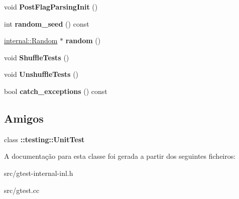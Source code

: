 \begin{DoxyCompactItemize}
\item 
\hypertarget{classtesting_1_1internal_1_1UnitTestImpl_a772894193104b1b2516f16e6ff813168}{void {\bfseries Post\-Flag\-Parsing\-Init} ()}\label{classtesting_1_1internal_1_1UnitTestImpl_a772894193104b1b2516f16e6ff813168}

\item 
\hypertarget{classtesting_1_1internal_1_1UnitTestImpl_a8ec59a7ab3bad96bccde98ce85ffc864}{int {\bfseries random\-\_\-seed} () const }\label{classtesting_1_1internal_1_1UnitTestImpl_a8ec59a7ab3bad96bccde98ce85ffc864}

\item 
\hypertarget{classtesting_1_1internal_1_1UnitTestImpl_ab3b45b5eb4d583219a3602011ea44347}{\hyperlink{classtesting_1_1internal_1_1Random}{internal\-::\-Random} $\ast$ {\bfseries random} ()}\label{classtesting_1_1internal_1_1UnitTestImpl_ab3b45b5eb4d583219a3602011ea44347}

\item 
\hypertarget{classtesting_1_1internal_1_1UnitTestImpl_aaaa38e6a4372e6bb9bbe3143a3a32b65}{void {\bfseries Shuffle\-Tests} ()}\label{classtesting_1_1internal_1_1UnitTestImpl_aaaa38e6a4372e6bb9bbe3143a3a32b65}

\item 
\hypertarget{classtesting_1_1internal_1_1UnitTestImpl_a1ee7db3bf8284dd9dce4dc857564bce3}{void {\bfseries Unshuffle\-Tests} ()}\label{classtesting_1_1internal_1_1UnitTestImpl_a1ee7db3bf8284dd9dce4dc857564bce3}

\item 
\hypertarget{classtesting_1_1internal_1_1UnitTestImpl_a0bbc6e237776ee6afaee106fe83e0406}{bool {\bfseries catch\-\_\-exceptions} () const }\label{classtesting_1_1internal_1_1UnitTestImpl_a0bbc6e237776ee6afaee106fe83e0406}

\end{DoxyCompactItemize}
\subsection*{Amigos}
\begin{DoxyCompactItemize}
\item 
\hypertarget{classtesting_1_1internal_1_1UnitTestImpl_a893404438388dec058dc5c02e8f9a014}{class {\bfseries \-::testing\-::\-Unit\-Test}}\label{classtesting_1_1internal_1_1UnitTestImpl_a893404438388dec058dc5c02e8f9a014}

\end{DoxyCompactItemize}


A documentação para esta classe foi gerada a partir dos seguintes ficheiros\-:\begin{DoxyCompactItemize}
\item 
src/gtest-\/internal-\/inl.\-h\item 
src/gtest.\-cc\end{DoxyCompactItemize}
